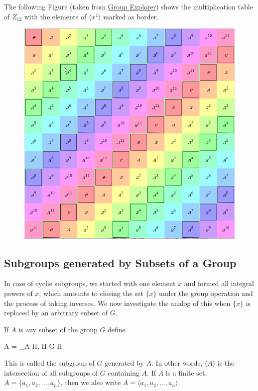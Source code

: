 The following Figure (taken from \href{https://nathancarter.github.io/group-explorer/Multtable.html?groupURL=https://nathancarter.github.io/group-explorer/groups/Z_12.group}{Group Explorer}) shows the multiplication table of $Z_{12}$ with the elements of $\langle x^4 \rangle$ marked as border.


\begin{figure}[H]
\centering
\includegraphics[scale=0.55]{images/2023-07-11_subgroup_Z12.png}
\end{figure}



\subsection{Subgroups generated by Subsets of a Group}

In case of cyclie subgroups, we started with one element $x$ and formed all integral powers of $x$, which amounts to closing the set $\{x\}$ under the group operation and the process of taking inverses. We now investigate the analog of this when $\{x\}$ is replaced by an arbitrary subset of $G$.


\begin{definition}
If $A$ is any subset of the group $G$ define

\bee
\langle A \rangle = \bigcap_{A \subseteq H, H \leq G} H
\eee

This is called the subgroup of $G$ generated by $A$. In other words, $\langle A \rangle$ is the intersection of all subgroups of $G$ containing $A$. If $A$ is a finite set, $A = \{a_1, a_2, \ldots, a_n \}$, then we also write $A = \langle a_1, a_2, \ldots, a_n \rangle$.
	
\end{definition}

